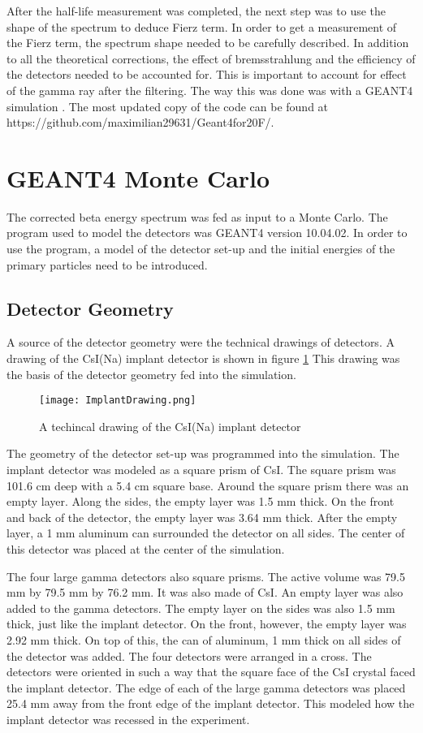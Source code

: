\documentclass[../MaxHughesThesis.tex]{subfiles}
\begin{document}
After the half-life measurement was completed, the next step was to use the shape of the spectrum to deduce Fierz term. 
In order to get a measurement of the Fierz term, the spectrum shape needed to be carefully described.
In addition to all the theoretical corrections, the effect of bremsstrahlung and the efficiency of the detectors needed to be accounted for.
This is important to account for effect of the gamma ray after the filtering.
The way this was done was with a GEANT4 simulation \cite{Ago03}.
The most updated copy of the code can be found at https://github.com/maximilian29631/Geant4for20F/.


\section{GEANT4 Monte Carlo}
The corrected beta energy spectrum was fed as input to a Monte Carlo.
The program used to model the detectors was GEANT4 version 10.04.02.
In order to use the program, a model of the detector set-up and the initial energies of the primary particles need to be introduced.  

\subsection{Detector Geometry}
A source of the detector geometry were the technical drawings of detectors. 
A drawing of the CsI(Na) implant detector is shown in figure \ref{fig:ImplantTech}
This drawing was the basis of the detector geometry fed into the simulation.

\begin{figure}[!htb]
	\centerline{\texttt{[image: ImplantDrawing.png]}}
	\caption{A techincal drawing of the CsI(Na) implant detector}
	\label{fig:ImplantTech}
\end{figure}

The geometry of the detector set-up was programmed into the simulation.
The implant detector was modeled as a square prism of CsI.
The square prism was 101.6 cm deep with a 5.4 cm square base.
Around the square prism there was an empty layer.
Along the sides, the empty layer was 1.5 mm thick.
On the front and back of the detector, the empty layer was 3.64 mm thick.
After the empty layer, a 1 mm aluminum can surrounded the detector on all sides.  
The center of this detector was placed at the center of the simulation.

The four large gamma detectors also square prisms.
The active volume was 79.5 mm by 79.5 mm by 76.2 mm.
It was also made of CsI.
An empty layer was also added to the gamma detectors.
The empty layer on the sides was also 1.5 mm thick, just like the implant detector.
On the front, however, the empty layer was 2.92 mm thick.
On top of this, the can of aluminum, 1 mm thick on all sides of the detector was added.
The four detectors were arranged in a cross.
The detectors were oriented in such a way that the square face of the CsI crystal faced the implant detector. 
The edge of each of the large gamma detectors was placed 25.4 mm away from the front edge of the implant detector.
This modeled how the implant detector was recessed in the experiment.
\end{document}
